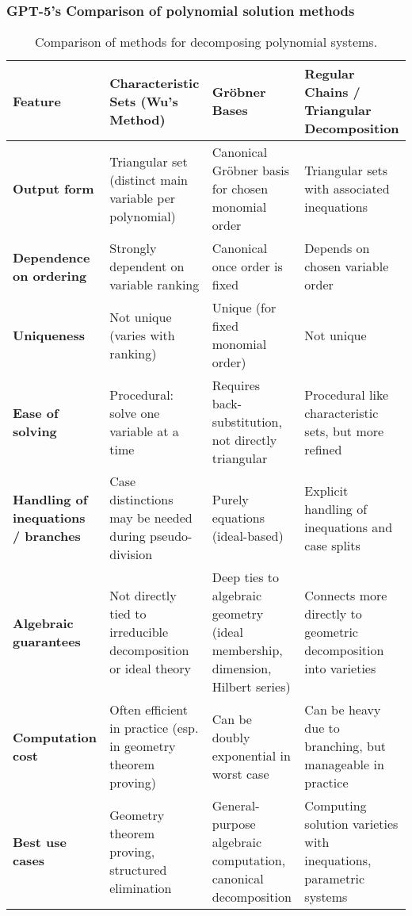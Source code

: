 \documentclass[11pt]{beamer}
\begin{document}
\begin{frame}
\frametitle{GPT-5's Comparison of polynomial solution methods}
\tiny
\begin{table}[h!]
\centering
\renewcommand{\arraystretch}{1.4}
\begin{tabular}{|p{2.3cm}|p{2cm}|p{2cm}|p{2.5cm}|}
\hline
\textbf{Feature} & \textbf{Characteristic Sets (Wu’s Method)} & \textbf{Gröbner Bases} & \textbf{Regular Chains / Triangular Decomposition} \\
\hline
\textbf{Output form} & Triangular set (distinct main variable per polynomial) & Canonical Gröbner basis for chosen monomial order & Triangular sets with associated inequations \\
\hline
\textbf{Dependence on ordering} & Strongly dependent on variable ranking & Canonical once order is fixed & Depends on chosen variable order \\
\hline
\textbf{Uniqueness} & Not unique (varies with ranking) & Unique (for fixed monomial order) & Not unique \\
\hline
\textbf{Ease of solving} & Procedural: solve one variable at a time & Requires back-substitution, not directly triangular & Procedural like characteristic sets, but more refined \\
\hline
\textbf{Handling of inequations / branches} & Case distinctions may be needed during pseudo-division & Purely equations (ideal-based) & Explicit handling of inequations and case splits \\
\hline
\textbf{Algebraic guarantees} & Not directly tied to irreducible decomposition or ideal theory & Deep ties to algebraic geometry (ideal membership, dimension, Hilbert series) & Connects more directly to geometric decomposition into varieties \\
\hline
\textbf{Computation cost} & Often efficient in practice (esp. in geometry theorem proving) & Can be doubly exponential in worst case & Can be heavy due to branching, but manageable in practice \\
\hline
\textbf{Best use cases} & Geometry theorem proving, structured elimination & General-purpose algebraic computation, canonical decomposition & Computing solution varieties with inequations, parametric systems \\
\hline
\end{tabular}
\caption{Comparison of methods for decomposing polynomial systems.}
\end{table}
\end{frame}
\end{document}
